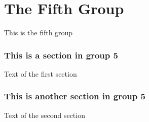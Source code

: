 \hypertarget{group__group5}{\section{The Fifth Group}
\label{group__group5}
}
This is the fifth group \hypertarget{mypage1}{}\subsubsection{This is a section in group 5}\label{mypage1}
Text of the first section \hypertarget{mypage2}{}\subsubsection{This is another section in group 5}\label{mypage2}
Text of the second section 